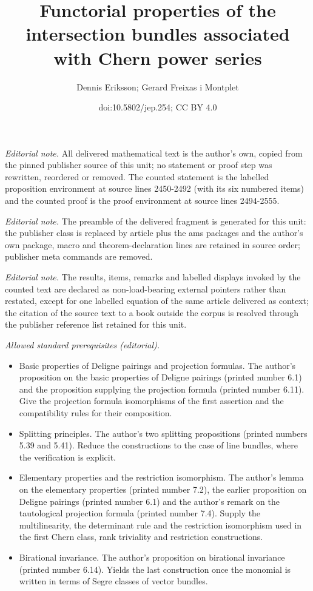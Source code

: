 \documentclass[11pt]{article}
\title{Functorial properties of the intersection bundles associated with Chern power series}
\author{Dennis Eriksson; Gerard Freixas i Montplet}
\date{doi:10.5802/jep.254; CC BY 4.0}
\theoremstyle{plain}
\theoremstyle{definition}
\begin{document}
\maketitle
\noindent\textit{Editorial note.} All delivered mathematical text is the author's own, copied from the pinned publisher source of this unit; no statement or proof step was rewritten, reordered or removed. The counted statement is the labelled proposition environment at source lines 2450-2492 (with its six numbered items) and the counted proof is the proof environment at source lines 2494-2555.\par\medskip
\noindent\textit{Editorial note.} The preamble of the delivered fragment is generated for this unit: the publisher class is replaced by article plus the ams packages and the author's own package, macro and theorem-declaration lines are retained in source order; publisher meta commands are removed.\par\medskip
\noindent\textit{Editorial note.} The results, items, remarks and labelled displays invoked by the counted text are declared as non-load-bearing external pointers rather than restated, except for one labelled equation of the same article delivered as context; the citation of the source text to a book outside the corpus is resolved through the publisher reference list retained for this unit.\par\medskip
\noindent\textit{Allowed standard prerequisites (editorial).}\begin{itemize}
\item Basic properties of Deligne pairings and projection formulas. The author's proposition on the basic properties of Deligne pairings (printed number 6.1) and the proposition supplying the projection formula (printed number 6.11). Give the projection formula isomorphisms of the first assertion and the compatibility rules for their composition.
\item Splitting principles. The author's two splitting propositions (printed numbers 5.39 and 5.41). Reduce the constructions to the case of line bundles, where the verification is explicit.
\item Elementary properties and the restriction isomorphism. The author's lemma on the elementary properties (printed number 7.2), the earlier proposition on Deligne pairings (printed number 6.1) and the author's remark on the tautological projection formula (printed number 7.4). Supply the multilinearity, the determinant rule and the restriction isomorphism used in the first Chern class, rank triviality and restriction constructions.
\item Birational invariance. The author's proposition on birational invariance (printed number 6.14). Yields the last construction once the monomial is written in terms of Segre classes of vector bundles.
\end{itemize}\medskip
\end{document}
